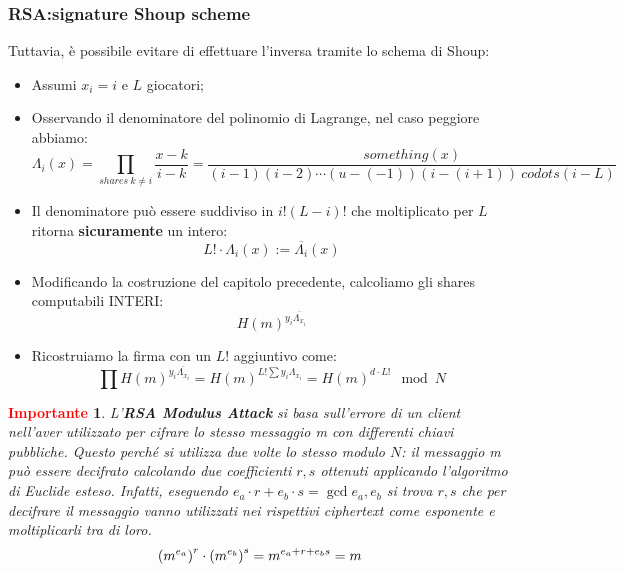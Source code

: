 \documentclass{book}
\newtheorem*{Importante}{\textbf{\textcolor{red}{Importante}}}
\begin{document}
\subsubsection{RSA:signature Shoup scheme}
Tuttavia, è possibile evitare di effettuare l'inversa tramite lo schema di Shoup:\begin{itemize}
	\item Assumi \(x_{i}=i\) e \(L\) giocatori;
	\item Osservando il denominatore del polinomio di Lagrange, nel caso peggiore abbiamo:\begin{equation*}
		      \Lambda_{i}(x)=\prod_{shares\ k\neq i}{\frac{x-k}{i-k}}=\frac{something(x)}{(i-1)(i-2)\cdots (u-(-1))(i-(i+1))\ codots (i-L)}
	      \end{equation*}
	\item Il denominatore può essere suddiviso in \(i!(L-i)! \) che moltiplicato per \(L\) ritorna \textbf{sicuramente} un intero:\begin{equation*}
		      L! \cdot \Lambda_{i}(x):=\overline{\Lambda_{i}}(x)
	      \end{equation*}
	\item Modificando la costruzione del capitolo precedente, calcoliamo gli shares computabili INTERI:\begin{equation*}
		      {H(m)}^{y_{i}\overline{\Lambda_{x_{i}}}}
	      \end{equation*}
	\item Ricostruiamo la firma con un \(L! \) aggiuntivo come:\begin{equation*}
		      \prod{H(m)}^{y_{i}\overline{\Lambda_{x_{i}}}}={H(m)}^{L! \sum{y_{i}\Lambda_{x_{i}}}}={H(m)}^{d\cdot L! }\mod{N}
	      \end{equation*}
\end{itemize}
\begin{Importante}
	L'\textbf{RSA Modulus Attack} si basa sull'errore di un client nell'aver utilizzato per cifrare lo stesso messaggio m con differenti chiavi pubbliche\@. Questo perché si utilizza due volte lo stesso modulo \(N\): il messaggio m può essere decifrato calcolando due coefficienti \(r,s\) ottenuti applicando l'algoritmo di Euclide esteso\@. \newline
	Infatti, eseguendo \(e_{a}\cdot r+e_{b}\cdot s=\gcd{e_{a},e_{b}} \) si trova \(r,s\) che per decifrare il messaggio vanno utilizzati nei rispettivi ciphertext come esponente e moltiplicarli tra di loro.
	\begin{equation*}
		\centering
		{(m^{e_{a}})}^{r}\cdot {(m^{e_{b}})}^{s}=m^{e_{a}+r+e_{b}s}=m
	\end{equation*}
\end{Importante}
\end{document}
